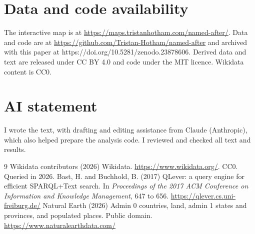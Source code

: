 \documentclass[11pt,a4paper]{article}
\begin{document}
\section*{Data and code availability}
The interactive map is at \url{https://maps.tristanhotham.com/named-after/}. Data and code are at \url{https://github.com/Tristan-Hotham/named-after} and archived with this paper at https://doi.org/10.5281/zenodo.23878606. Derived data and text are released under CC BY 4.0 and code under the MIT licence. Wikidata content is CC0.

\section*{AI statement}
I wrote the text, with drafting and editing assistance from Claude (Anthropic), which also helped prepare the analysis code. I reviewed and checked all text and results.

\begin{thebibliography}{9}
 Wikidata contributors (2026) Wikidata. \url{https://www.wikidata.org/}. CC0. Queried in 2026.
 Bast, H. and Buchhold, B. (2017) QLever: a query engine for efficient SPARQL+Text search. In \textit{Proceedings of the 2017 ACM Conference on Information and Knowledge Management}, 647 to 656. \url{https://qlever.cs.uni-freiburg.de/}
 Natural Earth (2026) Admin 0 countries, land, admin 1 states and provinces, and populated places. Public domain. \url{https://www.naturalearthdata.com/}
\end{thebibliography}
\end{document}
